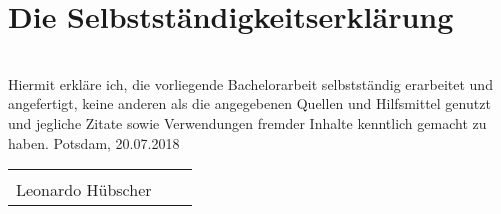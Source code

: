 \section{Die Selbstständigkeitserklärung}
\label{sec:selbstständigkeitserklärung}

\bigskip \\
Hiermit erkläre ich, die vorliegende Bachelorarbeit selbstständig erarbeitet und angefertigt, keine anderen als die
angegebenen Quellen und Hilfsmittel genutzt und jegliche Zitate sowie Verwendungen fremder Inhalte kenntlich gemacht zu haben.
\newline
\newline
\newline
Potsdam, 20.07.2018
\bigskip \\

\vspace{1.5 cm}
\begin{tabular}{p{7cm}p{.5cm}l}
    \dotfill \\
    Leonardo Hübscher
\end{tabular}